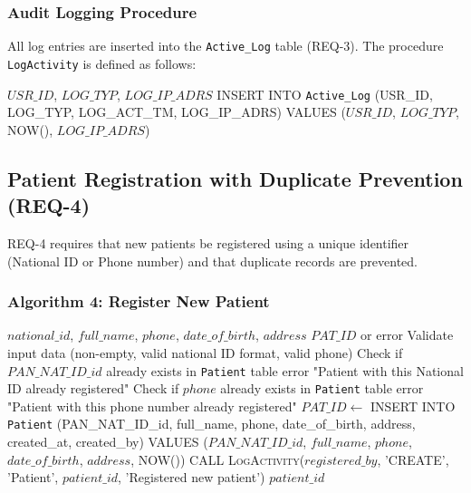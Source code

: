 \subsubsection{Audit Logging Procedure}

All log entries are inserted into the \texttt{Active\_Log} table (REQ-3). The procedure \texttt{LogActivity} is defined as follows:

\begin{algorithm}[H]
	\caption{Log Activity Procedure}
	\label{alg:log-activity}
	\begin{algorithmic}[1]
		\REQUIRE $USR\_ID$, $LOG\_TYP$, $LOG\_IP\_ADRS$
		\STATE INSERT INTO \texttt{Active\_Log} 
		(USR\_ID, LOG\_TYP, LOG\_ACT\_TM, LOG\_IP\_ADRS)
		VALUES ($USR\_ID$, $LOG\_TYP$, NOW(), $LOG\_IP\_ADRS$)
	\end{algorithmic}
\end{algorithm}


\subsection{Patient Registration with Duplicate Prevention (REQ-4)}

REQ-4 requires that new patients be registered using a unique identifier (National ID or Phone number) and that duplicate records are prevented.

\subsubsection{Algorithm 4: Register New Patient}

\begin{algorithm}[H]
	\caption{Register New Patient (with Duplicate Prevention)}
	\label{alg:register-patient}
	\begin{algorithmic}[1]
		\REQUIRE $national\_id$, $full\_name$, $phone$, $date\_of\_birth$, $address$
		\ENSURE $PAT\_ID$ or error
		\STATE Validate input data (non-empty, valid national ID format, valid phone)
		\STATE Check if $PAN\_NAT\_ID\_id$ already exists in \texttt{Patient} table
		\RETURN error "Patient with this National ID already registered"
		\ENDIF
		\STATE Check if $phone$ already exists in \texttt{Patient} table
		\RETURN error "Patient with this phone number already registered"
		\ENDIF
		\STATE $PAT\_ID \leftarrow$ INSERT INTO \texttt{Patient} 
		(PAN\_NAT\_ID\_id, full\_name, phone, date\_of\_birth, address, created\_at, created\_by)
		VALUES ($PAN\_NAT\_ID\_id$, $full\_name$, $phone$, $date\_of\_birth$, $address$, NOW())
		\STATE CALL \textsc{LogActivity}($registered\_by$, 'CREATE', 'Patient', $patient\_id$, 'Registered new patient')
		\RETURN $patient\_id$
	\end{algorithmic}
\end{algorithm}

